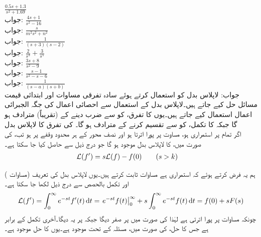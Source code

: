 \quad
$\frac{0.5s+1.3}{s^2+1.69}$\\
جواب:
\quad
$\frac{4s+1}{s^2-16}$\\
جواب:
\quad
$\frac{s}{m^2s^2+n^2}$\\
جواب:
\quad
$\frac{1}{(s+3)(s-2)}$\\
جواب:
\quad
$\frac{2}{s^3}+\frac{3}{s^5}$\\
جواب:
\quad
$\frac{3s+8}{s^2-9}$\\
جواب:
\quad
$\frac{s-1}{s^2-s-6}$\\
جواب:
\quad
$\frac{1}{(s-a)(s+b)}$\\
جواب:
لاپلاس بدل کو استعمال کرتے ہوئے سادہ تفرقی مساوات اور ابتدائی قیمت مسائل حل کیے جاتے ہیں۔لاپلاس بدل کے استعمال سے  احصائی اعمال کی جگہ الجبرائی اعمال استعمال کیے جاتے ہیں۔یوں  کا تفرق،  کو  سے ضرب دینے کے (تقریباً) مترادف ہو گا جبکہ  کا تکمل،   کو  سے تقسیم کرنے کے مترادف ہو گا۔ 
\quad {} کی تفرق کا لاپلاس بدل\\
اگر  تمام  پر استمراری ہو، مساوت  پر پورا اترتا ہو اور  نصف محور  کے ہر محدود وقفے پر  ہو تب،  کی صورت میں،  کا لاپلاس بدل موجود ہو گا جو درج ذیل سے حاصل کیا جا سکتا ہے۔
\begin{align} \label{مساوات_لاپلاس_درجہ_اول_تفرق}
\mathcal{L}(f')&=s\mathcal{L}(f)-f(0)\quad \quad (s>k)
\end{align}

ہم یہ  فرض کرتے ہوئے  کہ   استمراری ہے مساوات  ثابت کرتے ہیں۔یوں لاپلاس بدل کی تعریف (مساوات ) اور تکمل بالحصص سے درج ذیل لکھا جا سکتا ہے۔
\begin{align*}
\Laplace(f')=\int_{0}^{\infty} e^{-st} f'(t)\dif t=\left. e^{-st} f(t) \right|_{0}^{\infty}+s\int_{0}^{\infty} e^{-st}f(t)\dif t=f(0)+sF(s)
\end{align*}
چونکہ  مساوات  پر پورا اترتی ہے لہٰذا  کی صورت میں   پر صفر دیگا جبکہ  پر یہ  دیگا۔آخری تکمل  کے برابر ہے  جس کا حل،  کی  صورت میں، مسئلہ  کے تحت موجود ہے۔یوں  کا حل موجود ہے۔

